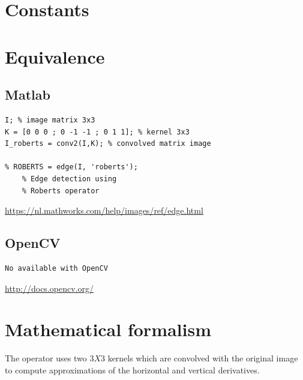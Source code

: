 \documentclass[12pt,a4paper]{article}
\begin{document}
\vspace{0.5cm}

\section*{Constants}


\newpage

\section*{Equivalence}
\subsection*{Matlab}

\lstset{language=Matlab}
\begin{lstlisting}
I; % image matrix 3x3
K = [0 0 0 ; 0 -1 -1 ; 0 1 1]; % kernel 3x3
I_roberts = conv2(I,K); % convolved matrix image 

% ROBERTS = edge(I, 'roberts'); 
	% Edge detection using 
	% Roberts operator

\end{lstlisting}

\url{https://nl.mathworks.com/help/images/ref/edge.html}


\subsection*{OpenCV}

\lstset{language=C++}
\begin{lstlisting}
No available with OpenCV
\end{lstlisting}

\url{http://docs.opencv.org/}

\section*{Mathematical formalism}

The operator uses two $3X3$ kernels which are convolved with the original image to compute approximations of the horizontal and vertical derivatives. \\
\end{document}
